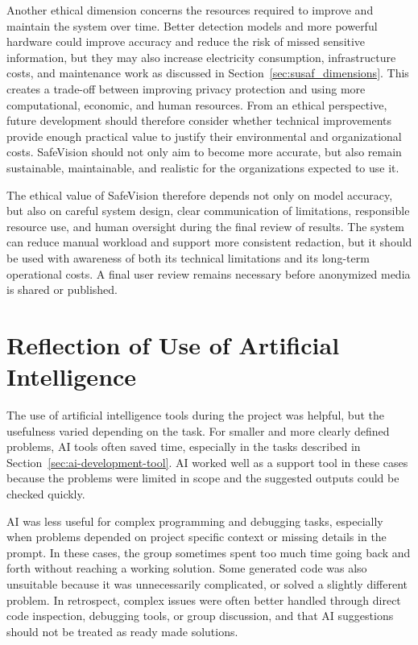 Another ethical dimension concerns the resources required to improve and maintain the system over time. Better detection models and more powerful hardware could improve accuracy and reduce the risk of missed sensitive information, but they may also increase electricity consumption, infrastructure costs, and maintenance work as discussed in Section~\ref{sec:susaf_dimensions}. This creates a trade-off between improving privacy protection and using more computational, economic, and human resources. From an ethical perspective, future development should therefore consider whether technical improvements provide enough practical value to justify their environmental and organizational costs. \gls{SafeVision} should not only aim to become more accurate, but also remain sustainable, maintainable, and realistic for the organizations expected to use it.

The ethical value of \gls{SafeVision} therefore depends not only on model accuracy, but also on careful system design, clear communication of limitations, responsible resource use, and human oversight during the final review of results. The system can reduce manual workload and support more consistent redaction, but it should be used with awareness of both its technical limitations and its long-term operational costs. A final user review remains necessary before anonymized media is shared or published.



\section{Reflection of Use of Artificial Intelligence}
\label{sec:reflection-ai-use}

The use of artificial intelligence tools during the project was helpful, but the usefulness varied depending on the task. For smaller and more clearly defined problems, AI tools often saved time, especially in the tasks described in Section~\ref{sec:ai-development-tool}. AI worked well as a support tool in these cases because the problems were limited in scope and the suggested outputs could be checked quickly.

AI was less useful for complex programming and debugging tasks, especially when problems depended on project specific context or missing details in the prompt. In these cases, the group sometimes spent too much time going back and forth without reaching a working solution. Some generated code was also unsuitable because it was unnecessarily complicated, or solved a slightly different problem. In retrospect, complex issues were often better handled through direct code inspection, debugging tools, or group discussion, and that AI suggestions should not be treated as ready made solutions.

